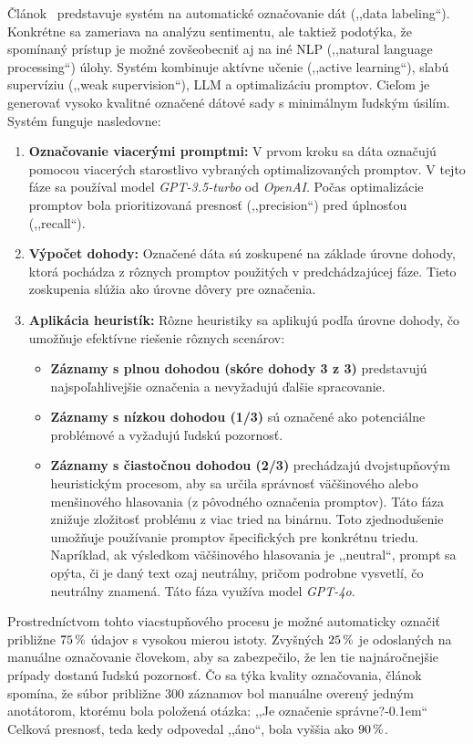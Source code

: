 Článok~\cite{data-labeling-llm} predstavuje systém na automatické označovanie dát (,,data labeling``). Konkrétne sa zameriava na analýzu sentimentu, ale taktiež podotýka, že spomínaný prístup je možné zovšeobecniť aj na iné NLP (,,natural language processing``) úlohy. Systém kombinuje aktívne učenie (,,active learning``), slabú supervíziu (,,weak supervision``), LLM a optimalizáciu promptov. Cieľom je generovať vysoko kvalitné označené dátové sady s minimálnym ľudským úsilím. Systém funguje nasledovne:
\begin{enumerate}
\item \textbf{Označovanie viacerými promptmi:} V prvom kroku sa dáta označujú pomocou viacerých starostlivo vybraných optimalizovaných promptov. V tejto fáze sa používal model \textit{GPT-3.5-turbo} od \textit{OpenAI}. Počas optimalizácie promptov bola prioritizovaná presnosť (,,precision``) pred úplnosťou (,,recall``).

\item \textbf{Výpočet dohody:} Označené dáta sú zoskupené na základe úrovne dohody, ktorá pochádza z rôznych promptov použitých v predchádzajúcej fáze. Tieto zoskupenia slúžia ako úrovne dôvery pre označenia.

\item \textbf{Aplikácia heuristík:} Rôzne heuristiky sa aplikujú podľa úrovne dohody, čo umožňuje efektívne riešenie rôznych scenárov:
\begin{itemize}
\item \textbf{Záznamy s plnou dohodou (skóre dohody 3 z 3)} predstavujú najspoľahlivejšie označenia a nevyžadujú ďalšie spracovanie.

\item \textbf{Záznamy s nízkou dohodou (1/3)} sú označené ako potenciálne problémové a vyžadujú ľudskú pozornosť.

\item \textbf{Záznamy s čiastočnou dohodou (2/3)} prechádzajú dvojstupňovým heuristickým procesom, aby sa určila správnosť väčšinového alebo menšinového hlasovania (z pôvodného označenia promptov). Táto fáza znižuje zložitosť problému z viac tried na binárnu. Toto zjednodušenie umožňuje používanie promptov špecifických pre konkrétnu triedu. Napríklad, ak výsledkom väčšinového hlasovania je ,,neutral``, prompt sa opýta, či je daný text ozaj neutrálny, pričom podrobne vysvetlí, čo neutrálny znamená. Táto fáza využíva model \textit{GPT-4o}.
\end{itemize}
\end{enumerate}

Prostredníctvom tohto viacstupňového procesu je možné automaticky označiť približne $75\,\rm \%$ údajov s vysokou mierou istoty. Zvyšných $25\,\rm \%$ je odoslaných na manuálne označovanie človekom, aby sa zabezpečilo, že len tie najnáročnejšie prípady dostanú ľudskú pozornosť. Čo sa týka kvality označovania, článok spomína, že súbor približne 300 záznamov bol manuálne overený jedným anotátorom, ktorému bola položená otázka: ,,Je označenie správne?\kern-0.1em{}`` Celková presnosť, teda kedy odpovedal ,,áno``, bola vyššia ako $90\,\rm \%$.
